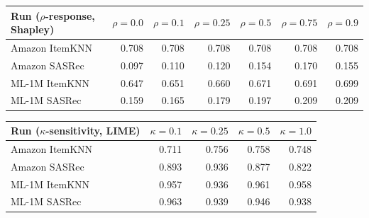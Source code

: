 \begin{table}[!htbp]
\begin{tabular}{@{}lrrrrrrrr@{}}
\bottomrule
\end{tabular}
\par\vspace{2mm}
\begin{tabular}{@{}lrrrrrr@{}}
\toprule
Run ($\rho$-response, Shapley) & $\rho=0.0$ & $\rho=0.1$ & $\rho=0.25$ & $\rho=0.5$ & $\rho=0.75$ & $\rho=0.9$ \\
\midrule
Amazon ItemKNN & 0.708 & 0.708 & 0.708 & 0.708 & 0.708 & 0.708 \\
Amazon SASRec & 0.097 & 0.110 & 0.120 & 0.154 & 0.170 & 0.155 \\
ML-1M ItemKNN & 0.647 & 0.651 & 0.660 & 0.671 & 0.691 & 0.699 \\
ML-1M SASRec & 0.159 & 0.165 & 0.179 & 0.197 & 0.209 & 0.209 \\
\bottomrule
\end{tabular}
\par\vspace{2mm}
\begin{tabular}{@{}lrrrr@{}}
\toprule
Run ($\kappa$-sensitivity, LIME) & $\kappa=0.1$ & $\kappa=0.25$ & $\kappa=0.5$ & $\kappa=1.0$ \\
\midrule
Amazon ItemKNN & 0.711 & 0.756 & 0.758 & 0.748 \\
Amazon SASRec & 0.893 & 0.936 & 0.877 & 0.822 \\
ML-1M ItemKNN & 0.957 & 0.936 & 0.961 & 0.958 \\
ML-1M SASRec & 0.963 & 0.939 & 0.946 & 0.938 \\
\bottomrule
\end{tabular}
\end{table}